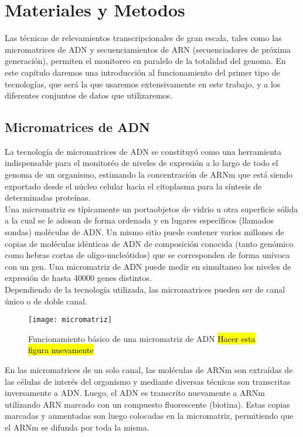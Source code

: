 \chapter{Materiales y Metodos}
Las técnicas de relevamientos transcripcionales de gran escala, tales como las micromatrices de ADN y secuenciamientos de ARN (secuenciadores de próxima generación), permiten el monitoreo en paralelo de la totalidad del genoma. En este capítulo daremos una introducción al funcionamiento del primer tipo de tecnologías, que será la que usaremos extensivamente en este trabajo, y a los diferentes conjuntos de datos que utilizaremos.\cite{Bose2016}

\section{Micromatrices de ADN}
La tecnología de micromatrices de ADN se constituyó como una herramienta indispensable para el monitoréo de niveles de expresión a lo largo de todo el genoma de un organismo, estimando la concentración de ARNm que está siendo exportado desde el núcleo celular hacia el citoplasma para la síntesis de determinadas proteínas.\\
Una micromatriz es típicamente un portaobjetos de vidrio u otra superficie sólida a la cual se le adosan de forma ordenada y en lugares específicos (llamados sondas) moléculas de ADN. Un mismo sitio puede contener varios millones de copias de moléculas idénticas de ADN de composición conocida (tanto genómico como hebras cortas de oligo-nucleótidos) que se corresponden de forma unívoca con un gen. Una micromatriz de ADN puede medir en simultaneo los niveles de expresión de hasta 40000 genes distintos.\\
Dependiendo de la tecnología utilizada, las micromatrices pueden ser de canal único o de doble canal.\\
\begin{figure}[h]
    \centering
    \texttt{[image: micromatriz]}
    \caption{Funcionamiento básico de una micromatriz de ADN \hl{Hacer esta figura nuevamente}}
    \label{fig:micromatriz}
\end{figure}
En las micromatrices de un solo canal, las moléculas de ARNm son extraídas de las células de interés del organismo y mediante diversas técnicas son transcritas inversamente a ADN. Luego, el ADN es transcrito nuevamente a ARNm utilizando ARN marcado con un compuesto fluorescente (biotina). Estas copias marcadas y aumentadas son luego colocadas en la micromatriz, permitiendo que el ARNm se difunda por toda la misma.\\
